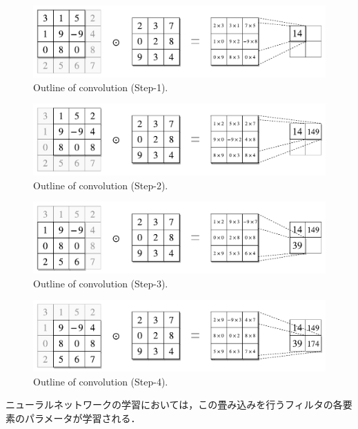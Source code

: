     \begin{figure}[ht]
      \centering
      \includegraphics[width=14cm]{8_appendix/img/conv_step_1.pdf}
      \caption{Outline of convolution (Step-1).}
      \label{fig:ex_conv_step_1}
    \end{figure}
    \begin{figure}[ht]
      \centering
      \includegraphics[width=14cm]{8_appendix/img/conv_step_2.pdf}
      \caption{Outline of convolution (Step-2).}
      \label{fig:ex_conv_step_2}
    \end{figure}
    \begin{figure}[ht]
      \centering
      \includegraphics[width=14cm]{8_appendix/img/conv_step_3.pdf}
      \caption{Outline of convolution (Step-3).}
      \label{fig:ex_conv_step_3}
    \end{figure}
    \begin{figure}[ht]
      \centering
      \includegraphics[width=14cm]{8_appendix/img/conv_step_4.pdf}
      \caption{Outline of convolution (Step-4).}
      \label{fig:ex_conv_step_4}
    \end{figure}
    ニューラルネットワークの学習においては，この畳み込みを行うフィルタの各要素のパラメータが学習される．

